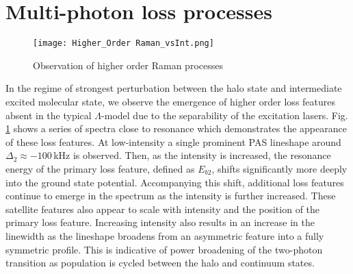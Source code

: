 %

\section{Multi-photon loss processes} \label{sec:highE_coupling}
	\begin{figure} 
	\centerline{
	  \texttt{[image: Higher\_Order Raman\_vsInt.png]}}
	  \caption{Observation of higher order Raman processes}{}
	  \label{fig:highIntMultiPhoton}
	\end{figure}
In the regime of strongest perturbation between the halo state and intermediate excited molecular state, we observe the emergence of higher order loss features absent in the typical $\Lambda$-model due to the separability of the excitation lasers. %
Fig.\,\ref{fig:highIntMultiPhoton} shows a series of spectra close to resonance which demonstrates the appearance of these loss features.
At low-intensity a single prominent PAS lineshape around $\Delta_2 \approx -100$\,kHz is observed.
Then, as the intensity is increased, the resonance energy of the primary loss feature, defined as $E_{b2}$, shifts significantly more deeply into the ground state potential.
Accompanying this shift, additional loss features continue to emerge in the spectrum as the intensity is further increased. These satellite features also appear to scale with intensity and the position of the primary loss feature.
Increasing intensity also results in an increase in the linewidth as the lineshape broadens from an asymmetric feature into a fully symmetric profile.
This is indicative of power broadening of the two-photon transition as population is cycled between the halo and continuum states.

